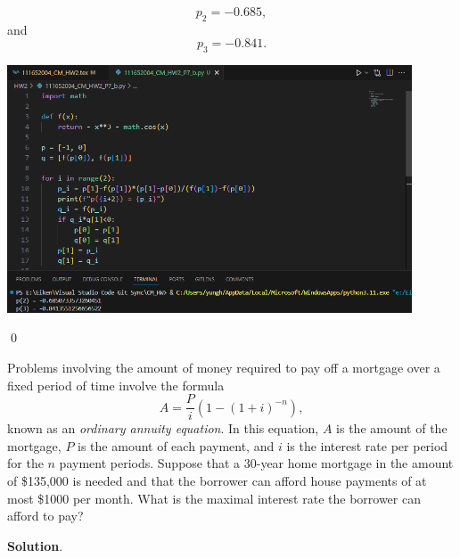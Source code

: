 \documentclass[11pt]{article}
\theoremstyle{break}
\numberwithin{equation}{theorem}
\begin{document}
\begin{enumerate}
    \begin{equation*}
        p_2=-0.685,
    \end{equation*}
    and
    \begin{equation*}
        p_3=-0.841.
    \end{equation*}
    \begin{center}
        \includegraphics[width=0.9\textwidth]{problem_7b_py.png}
    \end{center}
    \qed
\end{enumerate}


\newpage
\begin{problem}\label{problem 8}
    Problems involving the amount of money required to pay off a mortgage over a fixed period of time involve the formula
    \begin{equation*}
        A=\dfrac{P}{i}\left(1-(1+i)^{-n}\right),
    \end{equation*}
    known as an \emph{ordinary annuity equation}. In this equation, $A$ is the amount of the mortgage, $P$ is the amount of each payment, and $i$ is the interest rate per period for the $n$ payment periods. Suppose that a 30-year home mortgage in the amount of \$135,000 is needed and that the borrower can afford house payments of at most \$1000 per month. What is the maximal interest rate the borrower can afford to pay?
\end{problem}
\textbf{Solution}.
\end{document}
